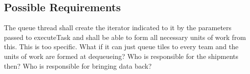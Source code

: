 \documentclass{article}
\begin{document}
\subsection{Possible Requirements}


The queue thread shall create the iterator indicated to it by the parameters
passed to executeTask and shall be able to form all necessary units of work from
this.  This is too specific.  What if it can just queue tiles to every team and
the units of work are formed at dequeueing?  Who is responsible for the
shipments then?  Who is responsible for bringing data back?

\end{document}
